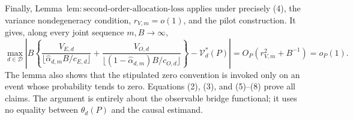 Finally, Lemma~\(\mathrm{lem{:}second\text{-}order\text{-}allocation\text{-}loss}\) applies under precisely (4), the variance nondegeneracy condition, \(r_{V,m}=o(1)\), and the pilot construction.  It gives, along every joint sequence \(m,B\to\infty\),
\[
\max_{d\in\mathcal D}\left|B\left\{
\frac{V_{E,d}}{\lfloor\widehat\alpha_{d,m}B/c_{E,d}\rfloor}
+\frac{V_{O,d}}{\lfloor(1-\widehat\alpha_{d,m})B/c_{O,d}\rfloor}
\right\}-\mathcal V_d^*(P)\right|
=O_P(r_{V,m}^2+B^{-1})=o_P(1).                                \tag{8}
\]
The lemma also shows that the stipulated zero convention is invoked only on an event whose probability tends to zero.  Equations (2), (3), and (5)--(8) prove all claims.  The argument is entirely about the observable bridge functional; it uses no equality between \(\theta_d(P)\) and the causal estimand.